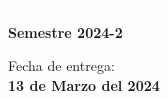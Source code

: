 \begin{titlepage}
\vspace{20mm}

\begin{minipage}{0.4\textwidth}
    \textcolor{white}{Semestre}\\
    \large\textbf{Semestre 2024-2}      
\end{minipage}
\begin{minipage}{0.4\textwidth}
    \begin{flushright}
        {\large Fecha de entrega:\\
         \textbf{13 de Marzo del 2024}}
    \end{flushright}
\end{minipage}

\makeatother

\vfill 
\end{titlepage}
